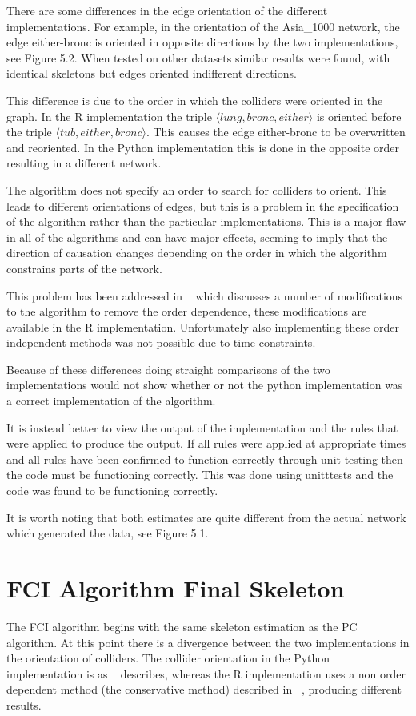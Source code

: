 \documentclass{UoYCSproject}
\begin{document}
There are some differences in the edge orientation of the different implementations. For example, in the orientation of the Asia\_1000 network, the edge either-bronc is oriented in opposite directions by the two implementations, see Figure 5.2. When tested on other datasets similar results were found, with identical skeletons but edges oriented indifferent directions. 

This difference is due to the order in which the colliders were oriented in the graph. In the R implementation the triple $ \langle lung, bronc, either\rangle$ is oriented before the triple $ \langle tub, either, bronc \rangle $. This causes the edge either-bronc to be overwritten and reoriented. In the Python implementation this is done in the opposite order resulting in a different network.

The algorithm does not specify an order to search for colliders to orient. This leads to different orientations of edges, but this is a problem in the specification of the algorithm rather than the particular implementations. This is a major flaw in all of the algorithms and can have major effects, seeming to imply that the direction of causation changes depending on the order in which the algorithm constrains parts of the network.

This problem has been addressed in ~\parencite{colombo2014order} which discusses a number of modifications to the algorithm to remove the order dependence, these modifications are available in the R implementation. Unfortunately also implementing these order independent methods was not possible due to time constraints.

Because of these differences doing straight comparisons of the two implementations would not show whether or not the python implementation was a correct implementation of the algorithm.

It is instead better to view the output of the implementation and the rules that were applied to produce the output. If all rules were applied at appropriate times and all rules have been confirmed to function correctly through unit testing then the code must be functioning correctly. This was done using unitttests and the code was found to be functioning correctly.

It is worth noting that both estimates are quite different from the actual network which generated the data, see Figure 5.1.

\section{FCI Algorithm Final Skeleton}
The FCI algorithm begins with the same skeleton estimation as the PC algorithm. At this point there is a divergence between the two implementations in the orientation of colliders. The collider orientation in the Python implementation is as ~\parencite{colombo2012learning2} describes, whereas the R implementation uses a non order dependent method (the conservative method) described in ~\parencite{colombo2014order}, producing different results. 
\end{document}
